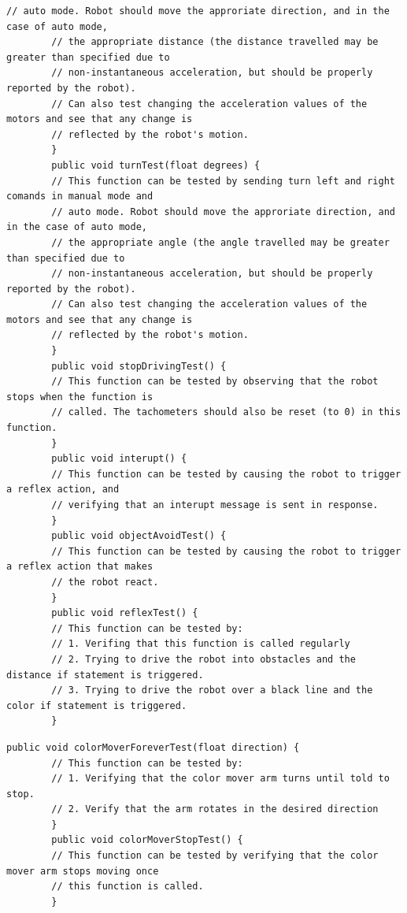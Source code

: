 \documentclass[12pt,a4paper]{article}
\begin{document}
\begin{lstlisting}[caption=Robot motion manual test suite, captionpos=b, label={lst:RobotMotionManualTestSuite}]
        // auto mode. Robot should move the approriate direction, and in the case of auto mode, 
        // the appropriate distance (the distance travelled may be greater than specified due to 
        // non-instantaneous acceleration, but should be properly reported by the robot).
        // Can also test changing the acceleration values of the motors and see that any change is
        // reflected by the robot's motion.
        }
        public void turnTest(float degrees) {
        // This function can be tested by sending turn left and right comands in manual mode and
        // auto mode. Robot should move the approriate direction, and in the case of auto mode, 
        // the appropriate angle (the angle travelled may be greater than specified due to 
        // non-instantaneous acceleration, but should be properly reported by the robot).
        // Can also test changing the acceleration values of the motors and see that any change is
        // reflected by the robot's motion.
        }
        public void stopDrivingTest() {
        // This function can be tested by observing that the robot stops when the function is 
        // called. The tachometers should also be reset (to 0) in this function.
        }
        public void interupt() {
        // This function can be tested by causing the robot to trigger a reflex action, and 
        // verifying that an interupt message is sent in response.
        }
        public void objectAvoidTest() {
        // This function can be tested by causing the robot to trigger a reflex action that makes
        // the robot react.
        }
        public void reflexTest() {
        // This function can be tested by:
        // 1. Verifing that this function is called regularly
        // 2. Trying to drive the robot into obstacles and the distance if statement is triggered.
        // 3. Trying to drive the robot over a black line and the color if statement is triggered.
        }
    	\end{lstlisting}
	\begin{lstlisting}[caption=Colour sensor motor motion manual test suite, captionpos=b, label={lst:ColourSensorMotorMotionManualTestSuite}]
	public void colorMoverForeverTest(float direction) {
        // This function can be tested by:
        // 1. Verifying that the color mover arm turns until told to stop.
        // 2. Verify that the arm rotates in the desired direction
        }
        public void colorMoverStopTest() {
        // This function can be tested by verifying that the color mover arm stops moving once 
        // this function is called.
        }
	\end{lstlisting}
\end{document}
